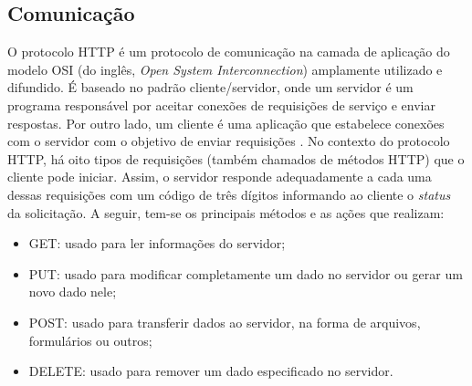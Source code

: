 



\subsection{Comunicação}
\label{sec:pis-comunicacao}

O protocolo HTTP é um protocolo de comunicação na camada de aplicação do modelo OSI (do inglês, \textit{Open System Interconnection}) amplamente utilizado e difundido. É baseado no padrão cliente/servidor, onde um servidor é um programa responsável por aceitar conexões de requisições de serviço e enviar respostas. Por outro lado, um cliente é uma aplicação que estabelece conexões com o servidor com o objetivo de enviar requisições \cite{berners1996hypertext}.  No contexto do protocolo HTTP, há oito tipos de requisições (também chamados de métodos HTTP) que o cliente pode iniciar. Assim, o servidor responde adequadamente a cada uma dessas requisições com um código de três dígitos informando ao cliente o \textit{status} da solicitação. A seguir, tem-se os principais métodos e as ações que realizam:

\begin{itemize}
    \item GET: usado para ler informações do servidor;
    \item PUT: usado para modificar completamente um dado no servidor ou gerar um novo dado nele;
    \item POST: usado para transferir dados ao servidor, na forma de arquivos, formulários ou outros;
    \item DELETE: usado para remover um dado especificado no servidor.
\end{itemize}

